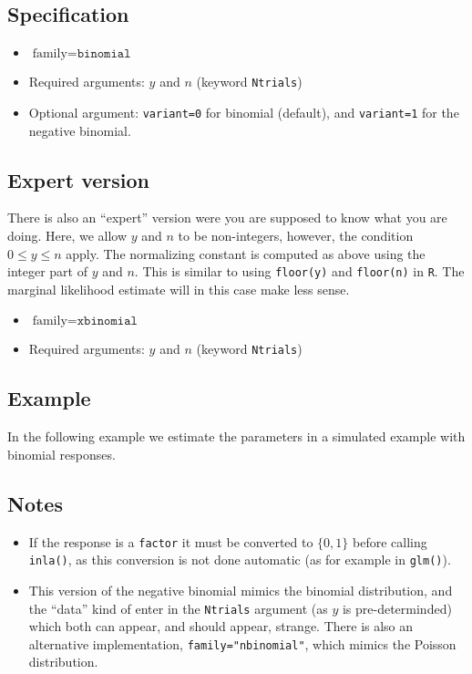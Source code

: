 \documentclass[a4paper,11pt]{article}
\begin{document}
\subsection*{Specification}

\begin{itemize}
\item $\text{family}=\texttt{binomial}$
\item Required arguments: $y$ and $n$ (keyword \texttt{Ntrials})
\item Optional argument: \texttt{variant=0} for binomial (default),
    and \texttt{variant=1} for the negative binomial.
\end{itemize}


\subsection*{Expert version}
There is also an ``expert'' version were you are supposed to know what
you are doing. Here, we allow $y$ and $n$ to be non-integers, however,
the condition $0\le y \le n$ apply. The normalizing constant is
computed as above using the integer part of $y$ and $n$. This is
similar to using \verb|floor(y)| and \verb|floor(n)| in \verb|R|. The
marginal likelihood estimate will in this case make less sense.
\begin{itemize}
\item $\text{family}=\texttt{xbinomial}$
\item Required arguments: $y$ and $n$ (keyword \texttt{Ntrials})
\end{itemize}


\subsection*{Example}

In the following example we estimate the parameters in a simulated
example with binomial responses.


\subsection*{Notes}

\begin{itemize}
\item If the response is a \verb|factor| it must be converted to
    $\{0,1\}$ before calling \verb|inla()|, as this conversion is not
    done automatic (as for example in \verb|glm()|).
\item This version of the negative binomial mimics the binomial
    distribution, and the ``data'' kind of enter in the
    \texttt{Ntrials} argument (as $y$ is pre-determinded) which both
    can appear, and should appear, strange. There is also an
    alternative implementation, \texttt{family="nbinomial"}, which
    mimics the Poisson distribution.
\end{itemize}
\end{document}
